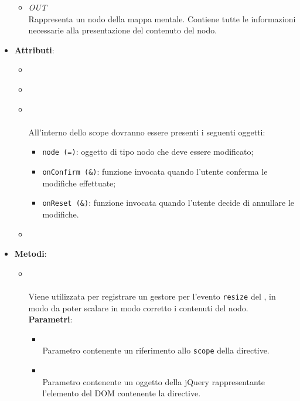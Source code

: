 \begin{itemize}
\begin{itemize}
\item \textit{OUT} \hyperref[\nogloxy{Premi::Front-End::Model::Node}]{}\\
Rappresenta un nodo della mappa mentale. Contiene tutte le informazioni necessarie alla presentazione del contenuto del nodo.
\end{itemize}
\item \textbf{Attributi}:
\begin{itemize}
\item {}
\\ \dpDirectiveController
\item {}
\\ \dpRestrict
\item {}
\\ \dpIsolatedScope \\
All'interno dello scope dovranno essere presenti i seguenti oggetti:
\begin{itemize}
\item \texttt{node (=)}: oggetto di tipo nodo che deve essere modificato;
\item \texttt{onConfirm (\&)}: funzione invocata quando l’utente conferma le modifiche effettuate;
\item \texttt{onReset (\&)}: funzione invocata quando l’utente decide di annullare le modifiche.
\end{itemize}
\item {}
\\ \dpTemplateUrl
\end{itemize}
\item \textbf{Metodi}:
\begin{itemize}
\item {}
\\ \dpLinkFn \\ Viene utilizzata per registrare un gestore per l'evento \texttt{resize} del , in modo da poter scalare in modo corretto i contenuti del nodo.
\\ \textbf{Parametri}:
\begin{itemize}
\item {}
\\ Parametro contenente un riferimento allo \texttt{scope} della directive.
\item {}
\\ Parametro contenente un oggetto della  jQuery rappresentante l'elemento del DOM contenente la directive.
\end{itemize}
\end{itemize}
\end{itemize}
